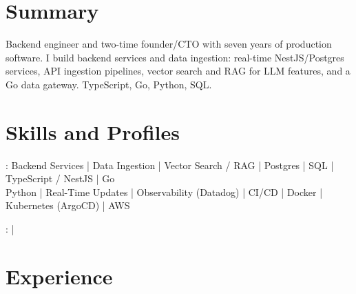 \documentclass[print]{jack-resume}
\begin{document}
\pagecolor{darkmodeBackground}


\begin{minipage}[t][1cm][t]{.03\textwidth}
    \hfill
\end{minipage}

\section{Summary}
Backend engineer and two-time founder/CTO with seven years of production software. I build backend services and data ingestion: real-time NestJS/Postgres services, API ingestion pipelines, vector search and RAG for LLM features, and a Go data gateway. TypeScript, Go, Python, SQL.
\sectionsep

\section{Skills and Profiles}
:
Backend Services \hfill | \hfill
Data Ingestion \hfill | \hfill
Vector Search / RAG \hfill | \hfill
Postgres \hfill | \hfill
SQL \hfill | \hfill
TypeScript / NestJS \hfill | \hfill
Go \\
\hspace{1.0cm} Python \hfill | \hfill
Real-Time Updates \hfill | \hfill
Observability (Datadog) \hfill | \hfill
CI/CD \hfill | \hfill
Docker \hfill | \hfill
Kubernetes (ArgoCD) \hfill | \hfill
AWS \\

\raggedright{
    :
      \href{https://www.linkedin.com/in/jack-sturtevant/}{ \ExternalLink} |
     \href{https://github.com/jacksturt}{ \ExternalLink}}

\section{Experience}
\end{document}
